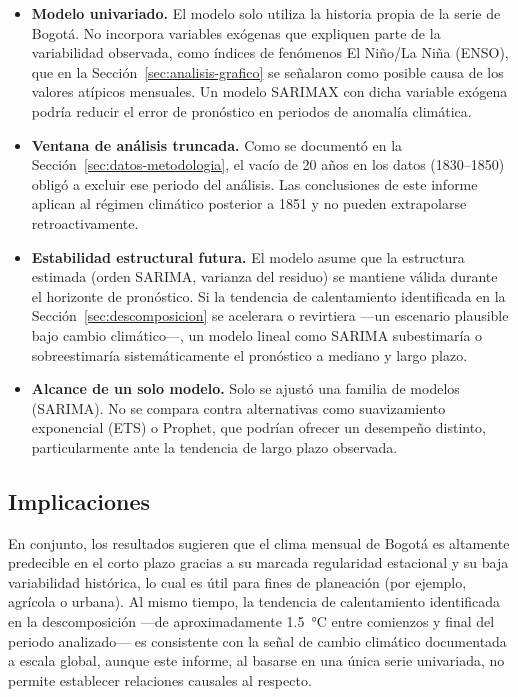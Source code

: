 \begin{itemize}
  \item \textbf{Modelo univariado.} El modelo solo utiliza la historia propia de la serie de
    Bogotá. No incorpora variables exógenas que expliquen parte de la variabilidad
    observada, como índices de fenómenos El Niño/La Niña (ENSO), que en la
    Sección~\ref{sec:analisis-grafico} se señalaron como posible causa de los valores
    atípicos mensuales. Un modelo SARIMAX con dicha variable exógena podría reducir el error
    de pronóstico en periodos de anomalía climática.
  \item \textbf{Ventana de análisis truncada.} Como se documentó en la
    Sección~\ref{sec:datos-metodologia}, el vacío de 20 años en los datos (1830--1850)
    obligó a excluir ese periodo del análisis. Las conclusiones de este informe aplican al
    régimen climático posterior a 1851 y no pueden extrapolarse retroactivamente.
  \item \textbf{Estabilidad estructural futura.} El modelo asume que la estructura estimada
    (orden SARIMA, varianza del residuo) se mantiene válida durante el horizonte de
    pronóstico. Si la tendencia de calentamiento identificada en la
    Sección~\ref{sec:descomposicion} se acelerara o revirtiera —un escenario plausible bajo
    cambio climático—, un modelo lineal como SARIMA subestimaría o sobreestimaría
    sistemáticamente el pronóstico a mediano y largo plazo.
  \item \textbf{Alcance de un solo modelo.} Solo se ajustó una familia de modelos (SARIMA).
    No se compara contra alternativas como suavizamiento exponencial (ETS) o Prophet, que
    podrían ofrecer un desempeño distinto, particularmente ante la tendencia de largo plazo
    observada.
\end{itemize}

\subsection{Implicaciones}

En conjunto, los resultados sugieren que el clima mensual de Bogotá es altamente predecible
en el corto plazo gracias a su marcada regularidad estacional y su baja variabilidad
histórica, lo cual es útil para fines de planeación (por ejemplo, agrícola o urbana). Al
mismo tiempo, la tendencia de calentamiento identificada en la descomposición —de
aproximadamente \SI{1.5}{\celsius} entre comienzos y final del periodo analizado— es
consistente con la señal de cambio climático documentada a escala global, aunque este
informe, al basarse en una única serie univariada, no permite establecer relaciones causales
al respecto.

